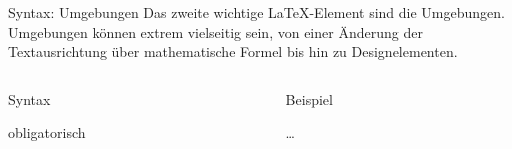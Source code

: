 \begin{frame}[fragile]{Syntax: Umgebungen}
  Das zweite wichtige \LaTeX-Element sind die Umgebungen.
  Umgebungen können extrem vielseitig sein, von einer Änderung der Textausrichtung über mathematische Formel bis hin zu Designelementen.
  \begin{columns}[T]
    \begin{column}{0.47\textwidth}
      \begin{block}{Syntax}
        \begin{lstverbatim}
        \begin{Umgebung*}[optional]
            {obligatorisch}
        \end{Umgebung*}
        \end{lstverbatim}
      \end{block}
    \end{column}
    \begin{column}{0.47\textwidth}
      \begin{block}{Beispiel}
        \begin{lstverbatim}
        \begin{flushright}
            …
        \end{flushright}
        \end{lstverbatim}
      \end{block}
    \end{column}
  \end{columns}
\end{frame}

